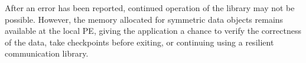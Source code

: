After an error has been reported, continued operation of the \openshmem 
library may not be possible. However, the memory allocated for 
symmetric data objects remains available at the local \ac{PE}, giving the 
application a chance to verify the correctness of the data, take checkpoints 
before exiting, or continuing using a resilient communication library.
